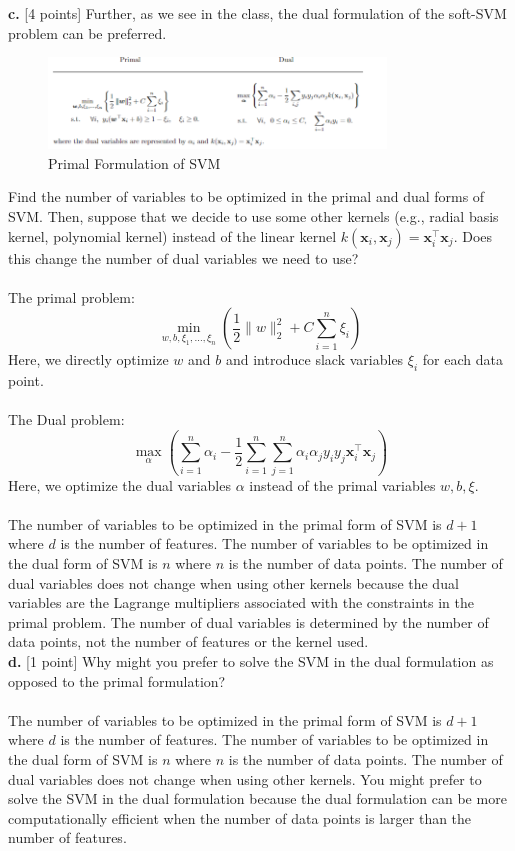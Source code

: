 \documentclass[a3paper,12pt]{extarticle} %
\begin{document}
\noindent \textbf{c.} [4 points] Further, as we see in the class, the dual formulation of the soft-SVM problem can be preferred.
\begin{figure}[h]
    \centering
    \includegraphics[width=0.8\textwidth]{primal.png}
    \caption{Primal Formulation of SVM}
    \label{fig:primal}
\end{figure}
\newline
[3 points] Find the number of variables to be optimized in the primal and dual forms of SVM. Then, suppose that we decide to use some other kernels (e.g., radial basis kernel, polynomial kernel) instead of the linear kernel \( k(\mathbf{x}_i, \mathbf{x}_j) = \mathbf{x}_i^\top \mathbf{x}_j \). Does this change the number of dual variables we need to use?
\\\\ The primal problem:
\[
\min_{w, b, \xi_1, \ldots, \xi_n} \left( \frac{1}{2} \|w\|_2^2 + C \sum_{i=1}^n \xi_i \right)
\]
Here, we directly optimize \( w \) and \( b \) and introduce slack variables \( \xi_i \) for each data point.
\\\\ The Dual problem:
\[
\max_{\alpha} \left( \sum_{i=1}^n \alpha_i - \frac{1}{2} \sum_{i=1}^n \sum_{j=1}^n \alpha_i \alpha_j y_i y_j \mathbf{x}_i^\top \mathbf{x}_j \right)
\]
Here, we optimize the dual variables \( \alpha \) instead of the primal variables \( w, b, \xi \).
\\\\ The number of variables to be optimized in the primal form of SVM is \( d + 1 \) where \( d \) is the number of features. The number of variables to be optimized in the dual form of SVM is \( n \) where \( n \) is the number of data points. The number of dual variables does not change when using other kernels because the dual variables are the Lagrange multipliers associated with the constraints in the primal problem. The number of dual variables is determined by the number of data points, not the number of features or the kernel used.\\


\noindent \textbf{d.} [1 point] Why might you prefer to solve the SVM in the dual formulation as opposed to the primal formulation?
\\\\ The number of variables to be optimized in the primal form of SVM is \( d + 1 \) where \( d \) is the number of features. The number of variables to be optimized in the dual form of SVM is \( n \) where \( n \) is the number of data points. The number of dual variables does not change when using other kernels. You might prefer to solve the SVM in the dual formulation because the dual formulation can be more computationally efficient when the number of data points is larger than the number of features.\\
\newpage
\end{document}
